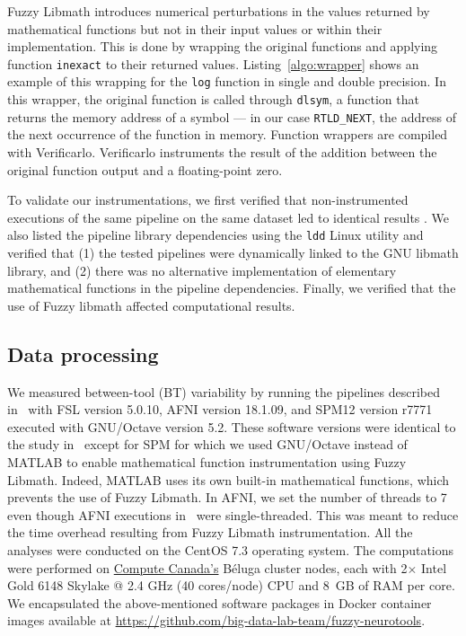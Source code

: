 \documentclass[conference]{IEEEtran}
\begin{document}
Fuzzy Libmath introduces numerical perturbations in the values returned by
mathematical functions but not in their input values or within their
implementation. This is done by wrapping the original functions and
applying function \texttt{inexact} to their returned values.
Listing~\ref{algo:wrapper} shows an example of this wrapping for the
\texttt{log} function in single and double precision. In this wrapper, the
original function is called through \texttt{dlsym}, a function that returns
the memory address of a symbol --- in our case \texttt{RTLD\_NEXT}, the
address of the next occurrence of the function in memory. Function wrappers
are compiled with Verificarlo. Verificarlo instruments the result of the
addition between the original function output and a floating-point zero.



To validate our instrumentations, we first verified that non-instrumented
executions of the same pipeline on the same dataset led to identical
results . We also listed the pipeline
library dependencies using the \texttt{ldd} Linux utility and verified that
(1) the tested pipelines were dynamically linked to the GNU libmath library, and 
(2) there was no alternative implementation of elementary mathematical functions in the pipeline dependencies.
Finally, we verified that the use of Fuzzy libmath affected computational results.

\subsection{Data processing}

We measured between-tool (BT) variability by running the pipelines
described in~\cite{bowring2019exploring} with FSL version 5.0.10, AFNI
version 18.1.09, and SPM12 version r7771 executed with GNU/Octave version
5.2. These software versions were identical to the study
in~\cite{bowring2019exploring} except for SPM for which we used GNU/Octave
instead of MATLAB to enable mathematical function instrumentation using
Fuzzy Libmath. Indeed, MATLAB uses its own built-in mathematical functions,
which prevents the use of Fuzzy Libmath. In AFNI, we set the number of
threads to 7 even though AFNI executions
in~\cite{bowring2019exploring} were single-threaded. This was meant to
reduce the time overhead resulting from Fuzzy Libmath instrumentation. All
the analyses were conducted on the CentOS 7.3 operating system. The
computations were performed on \href{https://www.computecanada.ca}{Compute
Canada's} Béluga cluster nodes, each with 2$\times$ Intel Gold 6148 Skylake
@ 2.4 GHz (40 cores/node) CPU and 8~GB of RAM per core. We encapsulated the
above-mentioned software packages in Docker container images available at
\url{https://github.com/big-data-lab-team/fuzzy-neurotools}.
\end{document}
